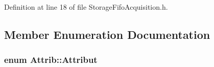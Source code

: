 Definition at line 18 of file StorageFifoAcquisition.h.

\subsection{Member Enumeration Documentation}
\hypertarget{classAttrib_a69e171d7cc6417835a5a306d3c764235}{
\subsubsection[{Attribut}]{\setlength{\rightskip}{0pt plus 5cm}enum {\bf Attrib::Attribut}}}
\label{classAttrib_a69e171d7cc6417835a5a306d3c764235}

